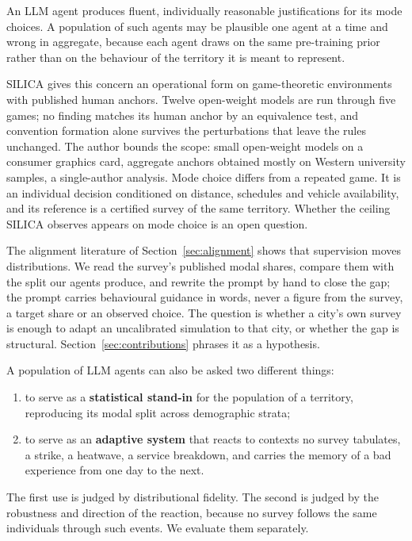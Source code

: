 An LLM agent produces fluent, individually reasonable justifications for its mode choices. A population of such agents may be plausible one agent at a time and wrong in aggregate, because each agent draws on the same pre-training prior rather than on the behaviour of the territory it is meant to represent.

SILICA \citep{bintareaf2026silica} gives this concern an operational form on game-theoretic environments with published human anchors. Twelve open-weight models are run through five games; no finding matches its human anchor by an equivalence test, and convention formation alone survives the perturbations that leave the rules unchanged.
The author bounds the scope: small open-weight models on a consumer graphics card, aggregate anchors obtained mostly on Western university samples, a single-author analysis. Mode choice differs from a repeated game. It is an individual decision conditioned on distance, schedules and vehicle availability, and its reference is a certified survey of the same territory. Whether the ceiling SILICA observes appears on mode choice is an open question.

The alignment literature of Section~\ref{sec:alignment} shows that supervision moves distributions. We read the survey's published modal shares, compare them with the split our agents produce, and rewrite the prompt by hand to close the gap; the prompt carries behavioural guidance in words, never a figure from the survey, a target share or an observed choice. The question is whether a city's own survey is enough to adapt an uncalibrated simulation to that city, or whether the gap is structural. Section~\ref{sec:contributions} phrases it as a hypothesis.

A population of LLM agents can also be asked two different things:

\begin{enumerate}
  \item to serve as a \textbf{statistical stand-in} for the population of a territory, reproducing its modal split across demographic strata;
  \item to serve as an \textbf{adaptive system} that reacts to contexts no survey tabulates, a strike, a heatwave, a service breakdown, and carries the memory of a bad experience from one day to the next.
\end{enumerate}

The first use is judged by distributional fidelity. The second is judged by the robustness and direction of the reaction, because no survey follows the same individuals through such events. We evaluate them separately.

